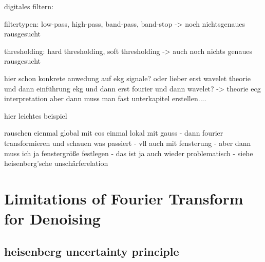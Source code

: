 \documentclass[a4paper,11pt,bibliography=totoc,listof=totoc,headinclude=true,cleardoublepage=empty,oneside]{scrbook}
\theoremstyle{definition}
\theoremstyle{remark}
\begin{document}
digitales filtern: \cite[S. 33]{cooleyFastFourierTransform1969}


filtertypen: low-pass, high-pass, band-pass, band-stop -> noch nichtsgenaues rausgesucht 


thresholding: hard thresholding, soft thresholding -> auch noch nichts genaues rausgesucht 


hier schon konkrete anwedung auf ekg signale? oder lieber erst wavelet theorie und dann einführung ekg und dann erst fourier und dann wavelet?
-> theorie ecg interpretation aber dann muss man fast unterkapitel erstellen....

hier leichtes beispiel

rauschen eienmal global mit cos einmal lokal mit gauss - dann fourier transformieren und schauen was passiert - vll auch mit fensterung - aber dann muss ich ja fenstergröße festlegen - das ist ja auch wieder problematisch - siehe heisenberg'sche unschärferelation



\section{Limitations of Fourier Transform for Denoising}
 \subsection{heisenberg uncertainty principle} %
  \cite[Chapter 5, Section 4]{steinFourierAnalysisIntroduction2003a} %
  \cite[Chapter 5, Theorem 4.1]{steinFourierAnalysisIntroduction2003a} %


\end{document}
